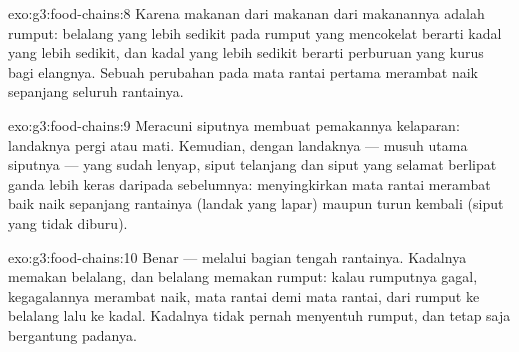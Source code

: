 \begin{solution}{exo:g3:food-chains:8}
Karena makanan dari makanan dari makanannya adalah rumput: belalang
yang lebih sedikit pada rumput yang mencokelat berarti kadal yang
lebih sedikit, dan kadal yang lebih sedikit berarti perburuan yang
kurus bagi elangnya. Sebuah perubahan pada mata rantai pertama
merambat naik sepanjang seluruh rantainya.
\end{solution}

\begin{solution}{exo:g3:food-chains:9}
Meracuni siputnya membuat pemakannya kelaparan: landaknya pergi atau
mati. Kemudian, dengan landaknya --- musuh utama siputnya --- yang
sudah lenyap, siput telanjang dan siput yang selamat berlipat ganda
lebih keras daripada sebelumnya: menyingkirkan mata rantai merambat
baik naik sepanjang rantainya (landak yang lapar) maupun turun
kembali (siput yang tidak diburu).
\end{solution}

\begin{solution}{exo:g3:food-chains:10}
Benar --- melalui bagian tengah rantainya. Kadalnya memakan belalang,
dan belalang memakan rumput: kalau rumputnya gagal, kegagalannya
merambat naik, mata rantai demi mata rantai, dari rumput ke belalang
lalu ke kadal. Kadalnya tidak pernah menyentuh rumput, dan tetap saja
bergantung padanya.
\end{solution}
